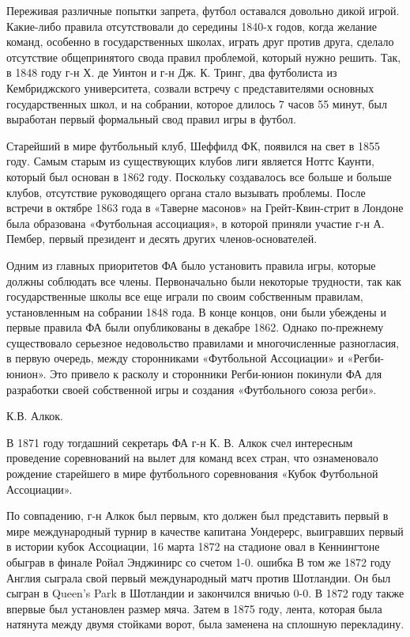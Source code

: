 Переживая различные попытки запрета, футбол оставался довольно дикой игрой. Какие-либо правила отсутствовали до середины 1840-х годов, когда желание команд, особенно в государственных школах, играть друг против друга, сделало отсутствие общепринятого свода правил проблемой, который нужно решить. Так, в 1848 году г-н Х. де Уинтон и г-н Дж. К. Тринг, два футболиста из Кембриджского университета, созвали встречу с представителями основных государственных школ, и на собрании, которое длилось 7 часов 55 минут, был выработан первый формальный свод правил игры в футбол.

Старейший в мире футбольный клуб, Шеффилд ФК, появился на свет в 1855 году. Самым старым из существующих клубов лиги является Ноттс Каунти, который был основан в 1862 году. Поскольку создавалось все больше и больше клубов, отсутствие руководящего органа стало вызывать проблемы. После встречи в октябре 1863 года в «Таверне масонов» на Грейт-Квин-стрит в Лондоне была образована «Футбольная ассоциация», в которой приняли участие г-н А. Пембер, первый президент и десять других членов-основателей.

Одним из главных приоритетов ФА было установить правила игры, которые должны соблюдать все члены. Первоначально были некоторые трудности, так как государственные школы все еще играли по своим собственным правилам, установленным на собрании 1848 года. В конце концов, они были убеждены и первые правила ФА были опубликованы в декабре 1862. Однако по-прежнему существовало серьезное недовольство правилами и многочисленные разногласия, в первую очередь, между сторонниками «Футбольной Ассоциации» и «Регби-юнион». Это привело к расколу и сторонники Регби-юнион покинули ФА для разработки своей собственной игры и создания «Футбольного союза регби».

К.В. Алкок.

В 1871 году тогдашний секретарь ФА г-н К. В. Алкок счел интересным проведение соревнований на вылет для команд всех стран, что ознаменовало рождение старейшего в мире футбольного соревнования «Кубок Футбольной Ассоциации».

По совпадению, г-н Алкок был первым, кто должен был представить первый в мире международный турнир в качестве капитана Уондерерс, выигравших первый в истории кубок Ассоциации, 16 марта 1872 на стадионе овал в Кеннингтоне обыграв в финале Ройал Энджинирс со счетом 1-0. ошибка В том же 1872 году Англия сыграла свой первый международный матч против Шотландии. Он был сыгран в Queen's Park в Шотландии и закончился вничью 0-0. В 1872 году также впервые был установлен размер мяча. Затем в 1875 году, лента, которая была натянута между двумя стойками ворот, была заменена на сплошную перекладину.

